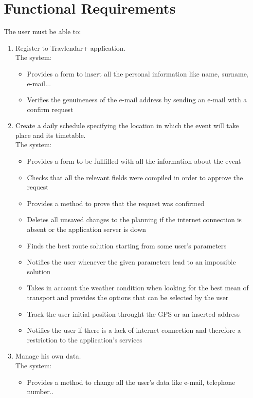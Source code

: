 \documentclass[numbers=noenddot, 12pt, a4paper, oneside]{scrbook}
\begin{document}
\section{Functional Requirements}
The user must be able to:
\begin{enumerate}
	\item Register to Travlendar+ application.\\ The system:
	\begin{itemize}
		\item Provides a form to insert all the personal information like name, surname, e-mail...
		\item Verifies the genuineness of the e-mail address by sending an e-mail with a confirm request
	\end{itemize}
	\item  Create a daily schedule specifying the location in which the event will take place and its timetable.\\
	The system:
	\begin{itemize}
		\item Provides a form to be fullfilled with all the information about the event
		\item Checks that all the relevant fields were compiled in order to approve the request
		\item Provides a method to prove that the request was confirmed
		\item Deletes all unsaved changes to the planning if the internet connection is absent or the application server is down
		\item Finds the best route solution starting from some user's parameters
		\item Notifies the user whenever the given parameters lead to an impossible solution
		\item Takes in account the weather condition when looking for the best mean of transport and provides the options that can be selected by the user
		\item Track the user initial position throught the GPS or an inserted address
		\item Notifies the user if there is a lack of internet connection and therefore a restriction to the application's services
	\end{itemize}
	\item Manage his own data.\\The system:
	\begin{itemize}
		\item Provides a method to change all the user's data like e-mail, telephone number..

\end{itemize}
\end{enumerate}
\end{document}
